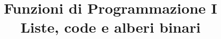 



\title{Funzioni di Programmazione I \\
Liste, code e alberi binari}

\maketitle

\newpage
\tableofcontents %

\newpage












